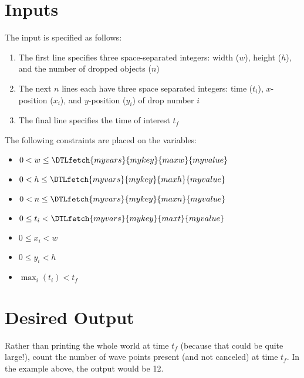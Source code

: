 \documentclass{article}
\newcommand{\var}[1]{\DTLfetch{myvars}{mykey}{#1}{myvalue}}
\begin{document}
	\section*{Inputs}
	The input is specified as follows:
	\begin{enumerate}
		\item The first line specifies three space-separated integers: width ($w$), height ($h$), and the number of dropped objects ($n$)
		\item The next $n$ lines each have three space separated integers: time ($t_i$), $x$-position ($x_i$), and $y$-position ($y_i$) of drop number $i$
		\item The final line specifies the time of interest $t_f$
	\end{enumerate}

	\noindent
	The following constraints are placed on the variables:
	\begin{itemize}
		\item $0 < w \leq \var{maxw}$
		\item $0 < h \leq \var{maxh}$
		\item $0 < n \leq \var{maxn}$

		\item $0 \leq t_i < \var{maxt}$
		\item $0 \leq x_i < w$
		\item $0 \leq y_i < h$

		\item $\max_i(t_i) < t_f$
	\end{itemize}

	\section*{Desired Output}
	Rather than printing the whole world at time $t_f$ (because that could be quite large!), count the number of wave points present (and not canceled) at time $t_f$. In the example above, the output would be 12.
\end{document}
